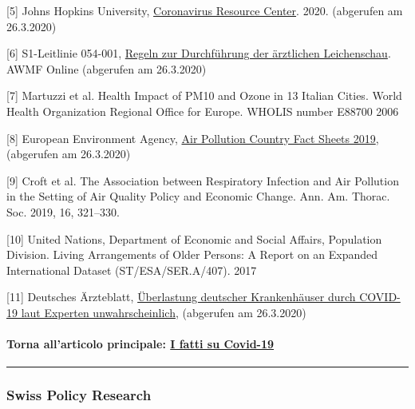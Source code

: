 {[}5{]} Johns Hopkins University,
\href{https://coronavirus.jhu.edu/map.html}{Coronavirus Resource
Center}. 2020. (abgerufen am 26.3.2020)

{[}6{]} S1-Leitlinie 054-001,
\href{https://www.awmf.org/uploads/tx_szleitlinien/054-002l_S1_Regeln-zur-Durchfuehrung-der-aerztlichen-Leichenschau_2018-02_01.pdf}{Regeln
zur Durchführung der ärztlichen Leichenschau}. AWMF Online (abgerufen am
26.3.2020)

{[}7{]} Martuzzi et al. Health Impact of PM10 and Ozone in 13 Italian
Cities. World Health Organization Regional Office for Europe. WHOLIS
number E88700 2006

{[}8{]} European Environment Agency,
\href{https://www.eea.europa.eu/themes/air/country-fact-sheets/2019-country-fact-sheets}{Air
Pollution Country Fact Sheets 2019}, (abgerufen am 26.3.2020)

{[}9{]} Croft et al. The Association between Respiratory Infection and
Air Pollution in the Setting of Air Quality Policy and Economic Change.
Ann. Am. Thorac. Soc. 2019, 16, 321--330.

{[}10{]} United Nations, Department of Economic and Social Affairs,
Population Division. Living Arrange­ments of Older Persons: A Report on
an Expanded International Dataset (ST/ESA/SER.A/407). 2017

{[}11{]} Deutsches Ärzteblatt,
\href{https://www.aerzteblatt.de/nachrichten/111029/Ueberlastung-deutscher-Krankenhaeuser-durch-COVID-19-laut-Experten-unwahrscheinlich}{Überlastung
deutscher Krankenhäuser durch COVID-19 laut Experten unwahrscheinlich},
(abgerufen am 26.3.2020)

\hypertarget{torna-allarticolo-principale-i-fatti-su-covid-19}{%
\paragraph{\texorpdfstring{Torna all'articolo principale:
\href{https://swprs.org/un-medico-svizzero-su-covid-19/}{I fatti su
Covid-19}}{Torna all'articolo principale: I fatti su Covid-19}}\label{torna-allarticolo-principale-i-fatti-su-covid-19}}

\begin{center}\rule{0.5\linewidth}{\linethickness}\end{center}

\hypertarget{swiss-policy-research}{%
\subsubsection{Swiss Policy Research}\label{swiss-policy-research}}

